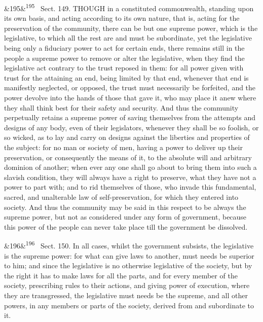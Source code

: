 \documentclass[12pt]{article}
\newcommand{\para}[1][]{\par\noindent\ifx&#1&\else\textsuperscript{\footnotesize #1}~\fi}
\begin{document}
\para[195] Sect. 149. THOUGH in a constituted commonwealth, standing upon its own basis, and acting according to its own nature, that is, acting for the preservation of the community, there can be but one supreme power, which is the legislative, to which all the rest are and must be subordinate, yet the legislative being only a fiduciary power to act for certain ends, there remains still in the people a supreme power to remove or alter the legislative, when they find the legislative act contrary to the trust reposed in them: for all power given with trust for the attaining an end, being limited by that end, whenever that end is manifestly neglected, or opposed, the trust must necessarily be forfeited, and the power devolve into the hands of those that gave it, who may place it anew where they shall think best for their safety and security. And thus the community perpetually retains a supreme power of saving themselves from the attempts and designs of any body, even of their legislators, whenever they shall be so foolish, or so wicked, as to lay and carry on designs against the liberties and properties of the subject: for no man or society of men, having a power to deliver up their preservation, or consequently the means of it, to the absolute will and arbitrary dominion of another; when ever any one shall go about to bring them into such a slavish condition, they will always have a right to preserve, what they have not a power to part with; and to rid themselves of those, who invade this fundamental, sacred, and unalterable law of self-preservation, for which they entered into society. And thus the community may be said in this respect to be always the supreme power, but not as considered under any form of government, because this power of the people can never take place till the government be dissolved.

\para[196] Sect. 150. In all cases, whilst the government subsists, the legislative is the supreme power: for what can give laws to another, must needs be superior to him; and since the legislative is no otherwise legislative of the society, but by the right it has to make laws for all the parts, and for every member of the society, prescribing rules to their actions, and giving power of execution, where they are transgressed, the legislative must needs be the supreme, and all other powers, in any members or parts of the society, derived from and subordinate to it.
\end{document}
